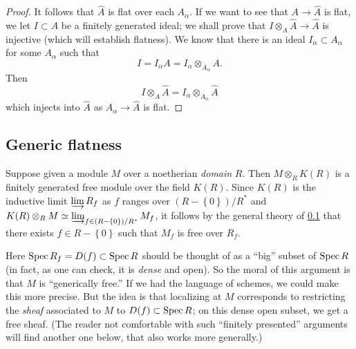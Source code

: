 \begin{proof}
It follows that $\hat{A}$ is flat over each $A_\alpha$. 
If we want to see that $A \to \hat{A}$ is flat, we let $I \subset A$ be a
finitely generated
ideal; we shall prove that $I \otimes_A \hat{A} \to \hat{A}$ is injective
(which will establish flatness). We know that there is an ideal $I_\alpha \subset A_\alpha$ for some
$A_\alpha$ such that
\[ I = I_\alpha A = I_\alpha \otimes_{A_\alpha} A.  \]
Then
\[ I \otimes_A \hat{A} = I_\alpha \otimes_{A_\alpha} \hat{A}  \]
which injects into $\hat{A}$ as $A_\alpha \to \hat{A}$ is flat. 

\begin{comment}
Let us first show that $A$ is \emph{separated} with respect to the
$\mathfrak{m}$-adic topology. Fix $x \in A$. Then $x$ lies in the subring
$A_\alpha$ for some fixed $\alpha$ depending on $\alpha$ (note that $A_\alpha
\to A$ is injective since a flat morphism of local rings is \emph{faithfully
flat}). If $x \in \mathfrak{m}^n = A \mathfrak{m}_\alpha^n$, then $x \in
\mathfrak{m}_\alpha^n$ by faithful flatness and \cref{intideal}.
So if $x \in \mathfrak{m}^n$ for all $n$, then $x \in \mathfrak{m}_\alpha^n$
for all $n$; the separatedness of $A_\alpha$ with respect to the
$\mathfrak{m}_\alpha$-adic topology now shows $x=0$.
\end{comment}


\end{proof} 


\subsection{Generic flatness}

Suppose given a module $M$ over a noetherian \emph{domain} $R$. Then $M
\otimes_R K(R)$ is a finitely generated free module over the field $K(R)$.
Since $K(R)$ is the inductive limit $\varinjlim R_f$ as $f$ ranges over $(R -
\left\{0\right\})/R^*$ and $K(R) \otimes_R M \simeq \varinjlim_{f \in (R -
\left\{0\right\})/R^*} M_f$, it follows by the general theory of \cref{} that
there exists $f \in R - \left\{0\right\}$ such that $M_f$ is free over $R_f$.

Here $\operatorname{Spec} R_f = D(f) \subset \operatorname{Spec} R$ should be thought of as a ``big''
subset of $\operatorname{Spec} R$ (in fact, as one can check, it is \emph{dense} and open).
So the moral of this argument is that $M$ is ``generically free.'' If we had
the language of schemes, we could make this more precise.
But the idea is that localizing at $M$ corresponds to restricting the
\emph{sheaf} associated to $M$ to $D(f) \subset \operatorname{Spec} R$; on this dense open subset, we
get a free sheaf.
(The reader not comfortable with such ``finitely presented'' arguments will
find another one below, that also works more generally.)

